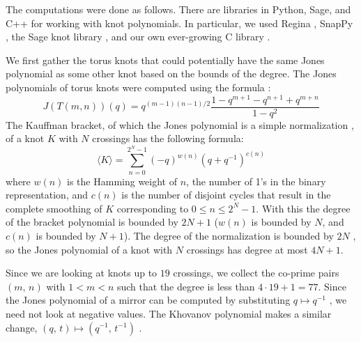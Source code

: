 \documentclass{article}
\theoremstyle{plain}
\begin{document}
        The computations were done as follows. There are libraries in Python,
        Sage, and C++ for working with knot polynomials. In particular, we used
        Regina \cite{regina}, SnapPy \cite{SnapPy}, the Sage knot library
        \cite{sage}, and our own ever-growing C library
        \cite{MaguireLibtmpl}.
        \par\hfill\par
        We first gather the torus knots that could potentially have the same
        Jones polynomial as some other knot based on the bounds of the degree.
        The Jones polynomials of torus knots were computed using the formula
        \cite{jonesfordummyvjones}:
        \begin{equation}
            \label{eqn:jones_poly_torus}%
            J(T(m,n))(q)=q^{(m-1)(n-1)/2}
                \frac{1-q^{m+1}-q^{n+1}+q^{m+n}}{1-q^{2}}
        \end{equation}
        The Kauffman bracket, of which the Jones polynomial is a simple
        normalization \cite{BarNatanKhovanovJones},
        of a knot $K$ with $N$ crossings has the following formula:
        \begin{equation}
            \langle{K}\rangle=\sum_{n=0}^{2^{N}-1}(-q)^{w(n)}(q+q^{-1})^{c(n)}
        \end{equation}
        where $w(n)$ is the Hamming weight of $n$, the number of 1's in the
        binary representation, and $c(n)$ is the number of disjoint cycles
        that result in the complete smoothing of $K$ corresponding to
        $0\leq{n}\leq{2}^{N}-1$. With this the degree of the bracket polynomial
        is bounded by $2N+1$ ($w(n)$ is bounded by $N$, and $c(n)$ is bounded
        by $N+1$). The degree of the normalization is bounded by $2N$
        \cite{BarNatanKhovanovJones}, so the
        Jones polynomial of a knot with $N$ crossings has degree at most
        $4N+1$.
        \par\hfill\par
        Since we are looking at knots up to $19$ crossings, we collect the
        co-prime pairs $(m,\,n)$ with $1<m<n$ such that the degree
        is less than $4\cdot{19}+1=77$. Since the Jones polynomial of a mirror
        can be computed by substituting $q\mapsto{q}^{-1}$
        \cite{JonesPolyJones}, we need not look at
        negative values. The Khovanov polynomial makes a similar change,
        $(q,\,t)\mapsto(q^{-1},\,t^{-1})$
        \cite{WATSON2017915}.
        \par\hfill\par
\end{document}
